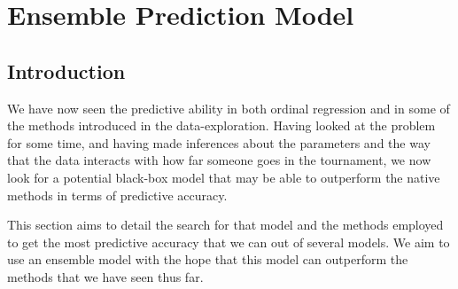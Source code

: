 \documentclass[10pt,a4paper, hidelinks]{article} %
\begin{document}
%


\section{Ensemble Prediction Model}
\subsection{Introduction}

We have now seen the predictive ability in both ordinal regression and in some of the methods introduced in the data-exploration. Having looked at the problem for some time, and having made inferences about the parameters and the way that the data interacts with how far someone goes in the tournament, we now look for a potential black-box model that may be able to outperform the native methods in terms of predictive accuracy. 

This section aims to detail the search for that model and the methods employed to get the most predictive accuracy that we can out of several models. We aim to use an ensemble model with the hope that this model can outperform the methods that we have  seen thus far. 
\end{document}
